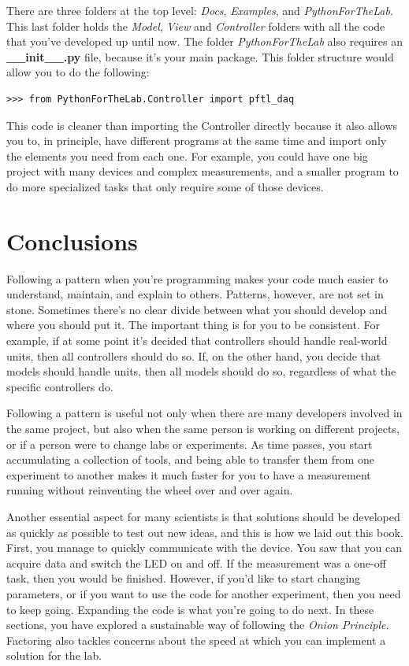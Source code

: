 There are three folders at the top level: \emph{Docs}, \emph{Examples}, and \emph{PythonForTheLab}. This last folder holds the \emph{Model}, \emph{View} and \emph{Controller} folders with all the code that you've developed up until now. The folder \emph{PythonForTheLab} also requires an \textbf{\_\_init\_\_.py} file, because it's your main package. This folder structure would allow you to do the following:

\begin{verbatim}
>>> from PythonForTheLab.Controller import pftl_daq
\end{verbatim}

This code is cleaner than importing the Controller directly because it also allows you to, in principle, have different programs at the same time and import only the elements you need from each one. For example, you could have one big project with many devices and complex measurements, and a smaller program to do more specialized tasks that only require some of those devices.

\section{Conclusions}\label{sec:layout-conclusions}
Following a pattern when you're programming makes your code much easier to understand, maintain, and explain to others. Patterns, however, are not set in stone. Sometimes there's no clear divide between what you should develop and where you should put it. The important thing is for you to be consistent. For example, if at some point it's decided that controllers should handle real-world units, then all controllers should do so. If, on the other hand, you decide that models should handle units, then all models should do so, regardless of what the specific controllers do.

Following a pattern is useful not only when there are many developers involved in the same project, but also when the same person is working on different projects, or if a person were to change labs or experiments. As time passes, you start accumulating a collection of tools, and being able to transfer them from one experiment to another makes it much faster for you to have a measurement running without reinventing the wheel over and over again.

Another essential aspect for many scientists is that solutions should be developed as quickly as possible to test out new ideas, and this is how we laid out this book. First, you manage to quickly communicate with the device. You saw that you can acquire data and switch the LED on and off. If the measurement was a one-off task, then you would be finished. However, if you'd like to start changing parameters, or if you want to use the code for another experiment, then you need to keep going. Expanding the code is what you're going to do next. In these sections, you have explored a sustainable way of following the \emph{Onion Principle}. Factoring also tackles concerns about the speed at which you can implement a solution for the lab.

